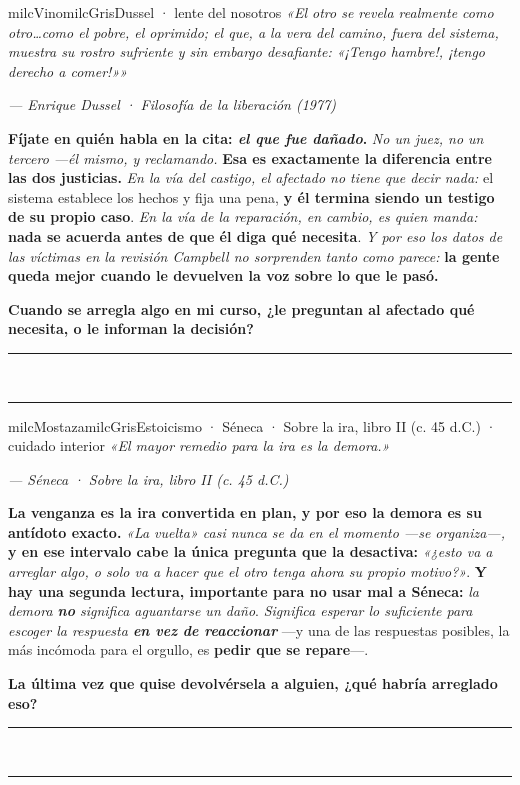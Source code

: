 \documentclass[11pt,letterpaper]{article}
\newcommand{\linead}[1]{\noindent\color{milcLinea}\rule{#1}{0.5pt}\color{milcNegro}}
\begin{document}
\begin{softbox}{milcVino}{milcGris}{Dussel · lente del nosotros}
\textit{«El otro se revela realmente como otro\ldots como el pobre, el oprimido; el que, a la vera del camino, fuera del sistema, muestra su rostro sufriente y sin embargo desafiante: «¡Tengo hambre!, ¡tengo derecho a comer!»»}

{\footnotesize\itshape\color{milcNegro!70}--- Enrique Dussel · Filosofía de la liberación (1977)}

\textbf{Fíjate en quién habla en la cita: \emph{el que fue dañado}.} \emph{No un juez, no un tercero ---él mismo, y reclamando.} \textbf{Esa es exactamente la diferencia entre las dos justicias.} \emph{En la vía del castigo, el afectado no tiene que decir nada:} el sistema establece los hechos y fija una pena, \textbf{y él termina siendo un testigo de su propio caso}. \emph{En la vía de la reparación, en cambio, es quien manda:} \textbf{nada se acuerda antes de que él diga qué necesita}. \emph{Y por eso los datos de las víctimas en la revisión Campbell no sorprenden tanto como parece:} \textbf{la gente queda mejor cuando le devuelven la voz sobre lo que le pasó.}

\textbf{Cuando se arregla algo en mi curso, ¿le preguntan al afectado qué necesita, o le informan la decisión?}
\end{softbox}
\linead{\linewidth}\\[1mm]
\linead{\linewidth}

\begin{softbox}{milcMostaza}{milcGris}{Estoicismo · Séneca · Sobre la ira, libro II (c. 45 d.C.) · cuidado interior}
\textit{«El mayor remedio para la ira es la demora.»}

{\footnotesize\itshape\color{milcNegro!70}--- Séneca · Sobre la ira, libro II (c. 45 d.C.)}

\textbf{La venganza es la ira convertida en plan, y por eso la demora es su antídoto exacto.} \emph{«La vuelta» casi nunca se da en el momento ---se organiza---,} \textbf{y en ese intervalo cabe la única pregunta que la desactiva:} \emph{«¿esto va a arreglar algo, o solo va a hacer que el otro tenga ahora su propio motivo?»}. \textbf{Y hay una segunda lectura, importante para no usar mal a Séneca:} \emph{la demora \textbf{no} significa aguantarse un daño}. \emph{Significa esperar lo suficiente para escoger la respuesta \textbf{en vez de reaccionar}} ---y una de las respuestas posibles, la más incómoda para el orgullo, es \textbf{pedir que se repare}---.

\textbf{La última vez que quise devolvérsela a alguien, ¿qué habría arreglado eso?}
\end{softbox}
\linead{\linewidth}\\[1mm]
\linead{\linewidth}
\end{document}
